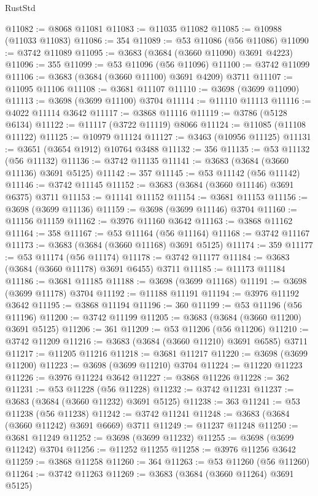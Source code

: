\begin{lexlean}{RustStd}
\begin{coremodule}
@11082 := @8068 @11081
@11083 := @11035 @11082
@11085 := @10988 (@11033 @11083)
@11086 := 354
@11089 := @53 @11086 (@56 @11086)
@11090 := @3742 @11089
@11095 := @3683 (@3684 (@3660 @11090) @3691 @4223)
@11096 := 355
@11099 := @53 @11096 (@56 @11096)
@11100 := @3742 @11099
@11106 := @3683 (@3684 (@3660 @11100) @3691 @4209) @3711
@11107 := @11095 @11106
@11108 := @3681 @11107
@11110 := @3698 (@3699 @11090)
@11113 := @3698 (@3699 @11100) @3704
@11114 := @11110 @11113
@11116 := @4022 @11114 @3642
@11117 := @3868 @11116
@11119 := @3786 (@5128 @6134)
@11122 := @11117 (@3722 @11119) @8066
@11124 := @11085 (@11108 @11122)
@11125 := @10979 @11124
@11127 := @3463 (@10956 @11125)
@11131 := @3651 (@3654 @1912) @10764 @3488
@11132 := 356
@11135 := @53 @11132 (@56 @11132)
@11136 := @3742 @11135
@11141 := @3683 (@3684 (@3660 @11136) @3691 @5125)
@11142 := 357
@11145 := @53 @11142 (@56 @11142)
@11146 := @3742 @11145
@11152 := @3683 (@3684 (@3660 @11146) @3691 @6375) @3711
@11153 := @11141 @11152
@11154 := @3681 @11153
@11156 := @3698 (@3699 @11136)
@11159 := @3698 (@3699 @11146) @3704
@11160 := @11156 @11159
@11162 := @3976 @11160 @3642
@11163 := @3868 @11162
@11164 := 358
@11167 := @53 @11164 (@56 @11164)
@11168 := @3742 @11167
@11173 := @3683 (@3684 (@3660 @11168) @3691 @5125)
@11174 := 359
@11177 := @53 @11174 (@56 @11174)
@11178 := @3742 @11177
@11184 := @3683 (@3684 (@3660 @11178) @3691 @6455) @3711
@11185 := @11173 @11184
@11186 := @3681 @11185
@11188 := @3698 (@3699 @11168)
@11191 := @3698 (@3699 @11178) @3704
@11192 := @11188 @11191
@11194 := @3976 @11192 @3642
@11195 := @3868 @11194
@11196 := 360
@11199 := @53 @11196 (@56 @11196)
@11200 := @3742 @11199
@11205 := @3683 (@3684 (@3660 @11200) @3691 @5125)
@11206 := 361
@11209 := @53 @11206 (@56 @11206)
@11210 := @3742 @11209
@11216 := @3683 (@3684 (@3660 @11210) @3691 @6585) @3711
@11217 := @11205 @11216
@11218 := @3681 @11217
@11220 := @3698 (@3699 @11200)
@11223 := @3698 (@3699 @11210) @3704
@11224 := @11220 @11223
@11226 := @3976 @11224 @3642
@11227 := @3868 @11226
@11228 := 362
@11231 := @53 @11228 (@56 @11228)
@11232 := @3742 @11231
@11237 := @3683 (@3684 (@3660 @11232) @3691 @5125)
@11238 := 363
@11241 := @53 @11238 (@56 @11238)
@11242 := @3742 @11241
@11248 := @3683 (@3684 (@3660 @11242) @3691 @6669) @3711
@11249 := @11237 @11248
@11250 := @3681 @11249
@11252 := @3698 (@3699 @11232)
@11255 := @3698 (@3699 @11242) @3704
@11256 := @11252 @11255
@11258 := @3976 @11256 @3642
@11259 := @3868 @11258
@11260 := 364
@11263 := @53 @11260 (@56 @11260)
@11264 := @3742 @11263
@11269 := @3683 (@3684 (@3660 @11264) @3691 @5125)

\end{coremodule}
\end{lexlean}
